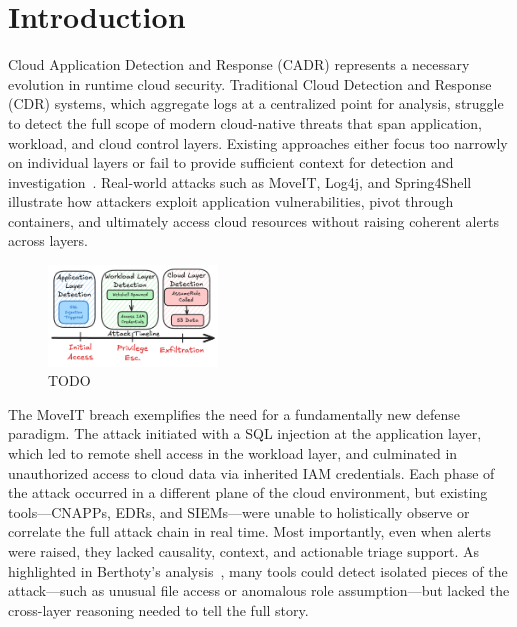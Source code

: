 \section*{Introduction}

Cloud Application Detection and Response (CADR) represents a necessary evolution in runtime cloud security. Traditional Cloud Detection and Response (CDR) systems, which aggregate logs at a centralized point for analysis, struggle to detect the full scope of modern cloud-native threats that span application, workload, and cloud control layers. Existing approaches either focus too narrowly on individual layers or fail to provide sufficient context for detection and investigation~\cite{berthoty2025runtime}. Real-world attacks such as MoveIT, Log4j, and Spring4Shell illustrate how attackers exploit application vulnerabilities, pivot through containers, and ultimately access cloud resources without raising coherent alerts across layers.


\begin{figure}
    \centering \includegraphics[width=0.40\textwidth]{fig/moveit.png}
    \caption{TODO}
    \label{fig:example:moveit}
    \vspace{-2ex}
\end{figure}

The MoveIT breach exemplifies the need for a fundamentally new defense paradigm. The attack initiated with a SQL injection at the application layer, which led to remote shell access in the workload layer, and culminated in unauthorized access to cloud data via inherited IAM credentials. Each phase of the attack occurred in a different plane of the cloud environment, but existing tools—CNAPPs, EDRs, and SIEMs—were unable to holistically observe or correlate the full attack chain in real time. Most importantly, even when alerts were raised, they lacked causality, context, and actionable triage support. As highlighted in Berthoty’s analysis~\cite{berthoty2025runtime}, many tools could detect isolated pieces of the attack—such as unusual file access or anomalous role assumption—but lacked the cross-layer reasoning needed to tell the full story.


